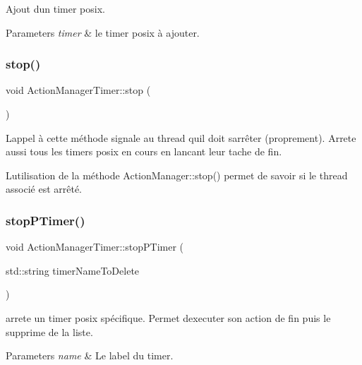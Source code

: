 Ajout d\textquotesingle{}un timer posix. 


\begin{DoxyParams}{Parameters}
{\em timer} & le timer posix à ajouter. \\
\hline
\end{DoxyParams}
\mbox{\label{classActionManagerTimer_a072223491745aebbaa0344124635b7f8}} 
\subsubsection{\texorpdfstring{stop()}{stop()}}
{\footnotesize\ttfamily void Action\+Manager\+Timer\+::stop (\begin{DoxyParamCaption}{ }\end{DoxyParamCaption})}



L\textquotesingle{}appel à cette méthode signale au thread qu\textquotesingle{}il doit s\textquotesingle{}arrêter (proprement). Arrete aussi tous les timers posix en cours en lancant leur tache de fin. 

L\textquotesingle{}utilisation de la méthode Action\+Manager\+::stop() permet de savoir si le thread associé est arrêté. \mbox{\label{classActionManagerTimer_a77bc841824ad1722363dd29a351a74cf}} 
\subsubsection{\texorpdfstring{stop\+P\+Timer()}{stopPTimer()}}
{\footnotesize\ttfamily void Action\+Manager\+Timer\+::stop\+P\+Timer (\begin{DoxyParamCaption}\item[{std\+::string}]{timer\+Name\+To\+Delete }\end{DoxyParamCaption})}



arrete un timer posix spécifique. Permet d\textquotesingle{}executer son action de fin puis le supprime de la liste. 


\begin{DoxyParams}{Parameters}
{\em name} & Le label du timer. \\
\hline
\end{DoxyParams}
\mbox{\label{classActionManagerTimer_a3043c43e2b56ed05633d68bf5c530c1f}} 

